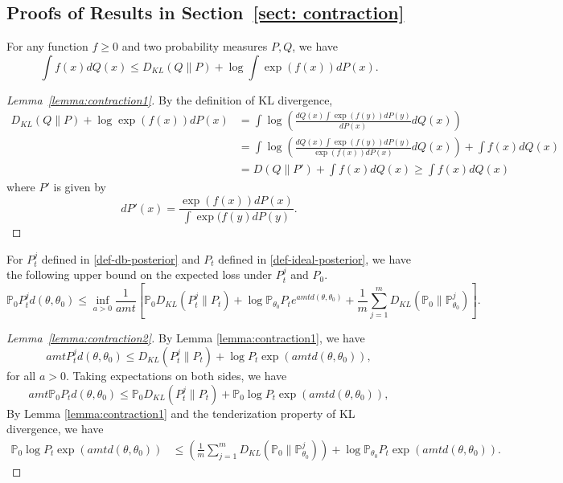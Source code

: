 \documentclass[twoside,11pt]{article}
\numberwithin{equation}{section}
\newcommand\bP{\mathbb{P}}
\begin{document}
{\subsection*{Proofs of Results in Section~\ref{sect: contraction}}\label{app: contraction}
\begin{lemma}\label{lemma:contraction1}
    For any function $f \geq 0$ and two probability measures $P, Q$, we have 
    \begin{equation*}
        \int f(x) dQ(x) \leq D_{KL}(Q \parallel P) + \log \int \exp(f(x)) dP(x). 
    \end{equation*}
\end{lemma}
\begin{proof}[Lemma~\ref{lemma:contraction1}]
    By the definition of KL divergence, 
    \begin{align*}
        D_{KL}(Q \parallel P) + \log \exp(f(x)) d P(x) &= \int \log\left(\frac{dQ(x) \int \exp(f(y)) dP(y)}{dP(x)} dQ(x) \right) \\
        &= \int \log\left(\frac{dQ(x) \int \exp(f(y)) dP(y)}{\exp(f(x)) dP(x)} dQ(x) \right)  + \int f(x) dQ(x) \\
        &= D(Q \parallel P') + \int f(x) dQ(x) \geq \int f(x) dQ(x)
    \end{align*}
where $P'$ is given by
\begin{equation*}
    dP'(x) = \frac{\exp(f(x)) dP(x)}{\int \exp(f(y) dP(y)}. 
\end{equation*}
\end{proof}
\begin{lemma} \label{lemma:contraction2}
For $P_t^j$ defined in \eqref{def-db-posterior} and $P_t$ defined in \eqref{def-ideal-posterior}, we have the following upper bound on the expected loss under $P_t^j$ and $P_0$. 
 \begin{equation*}
     \bP_0 P_t^j d(\theta, \theta_0) \leq  \inf_{a > 0} \frac{1}{amt} \left[ \bP_0 D_{KL}(P_t^j \parallel P_t) + \log \bP_{\theta_0} P_te^{a mt d(\theta, \theta_0) } + \frac{1}{m}\sum_{j = 1}^m D_{KL}(\bP_0 \parallel \bP_{\theta_0}^j) \right]. 
 \end{equation*}
\end{lemma}
\begin{proof}[Lemma~\ref{lemma:contraction2}]
    By Lemma \ref{lemma:contraction1}, we have 
    \begin{equation*}
        amtP_t^jd(\theta, \theta_0)  \leq D_{KL}(P_t^j \parallel P_t) + \log P_t\exp(amt d(\theta, \theta_0)),  
    \end{equation*}
    for all $a > 0$. 
    Taking expectations on both sides, we have
 \begin{equation*}
     amt\bP_0 P_t d(\theta, \theta_0)  \leq \bP_0 D_{KL}(P_t^j \parallel P_t) + \bP_0 \log P_t\exp(amt d(\theta, \theta_0)),  
 \end{equation*}
 By Lemma \ref{lemma:contraction1} and the tenderization property of KL divergence, we have
 \begin{align*}
    \bP_0 \log P_t\exp(amtd(\theta, \theta_0)) &\leq \left( \frac{1}{m} \sum_{j = 1}^m D_{KL}(\bP_0 \parallel \bP_{\theta_0}^j) \right) +  \log \bP_{\theta_0} P_t\exp(amt d(\theta, \theta_0)). 
 \end{align*}
 

\end{proof}}
\end{document}
